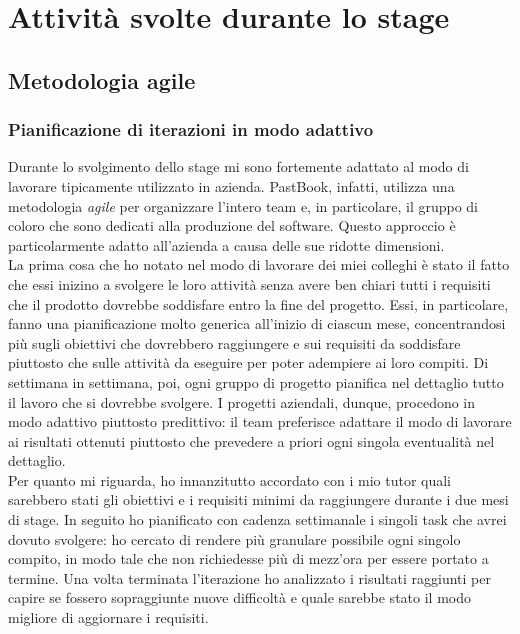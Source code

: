 \chapter{Attività svolte durante lo stage}
	\section{Metodologia agile}
		\subsection{Pianificazione di iterazioni in modo adattivo}
			Durante lo svolgimento dello stage mi sono fortemente adattato al modo di lavorare tipicamente utilizzato in azienda.
			PastBook, infatti, utilizza una metodologia \emph{agile} per organizzare l'intero team e, in particolare, il gruppo di coloro
			che sono dedicati alla produzione del software. Questo approccio è particolarmente adatto all'azienda a causa delle sue
			ridotte dimensioni.\\
			La prima cosa che ho notato nel modo di lavorare dei miei colleghi è stato il fatto che essi inizino a svolgere le loro
			attività senza avere ben chiari tutti i requisiti che il prodotto dovrebbe soddisfare entro la fine del progetto.
			Essi, in particolare, fanno una pianificazione molto generica all'inizio di ciascun mese, concentrandosi più sugli
			obiettivi che dovrebbero raggiungere e sui requisiti da soddisfare piuttosto che sulle attività da eseguire per poter
			adempiere ai loro compiti. Di settimana in settimana, poi, ogni gruppo di progetto pianifica nel dettaglio tutto il lavoro
			che si dovrebbe svolgere. I progetti aziendali, dunque, procedono in modo adattivo piuttosto predittivo: il team preferisce
			adattare il modo di lavorare ai risultati ottenuti piuttosto che prevedere a priori ogni singola eventualità nel dettaglio.\\
			Per quanto mi riguarda, ho innanzitutto accordato con i mio tutor quali sarebbero stati gli obiettivi e i requisiti minimi
			da raggiungere durante i due mesi di stage. In seguito ho pianificato con cadenza settimanale i singoli task che avrei
			dovuto svolgere: ho cercato di rendere più granulare possibile ogni singolo compito, in modo tale che non richiedesse più di
			mezz'ora per essere portato a termine. Una volta terminata l'iterazione ho analizzato i risultati raggiunti per capire se
			fossero sopraggiunte nuove difficoltà e quale sarebbe stato il modo migliore di aggiornare i requisiti.
